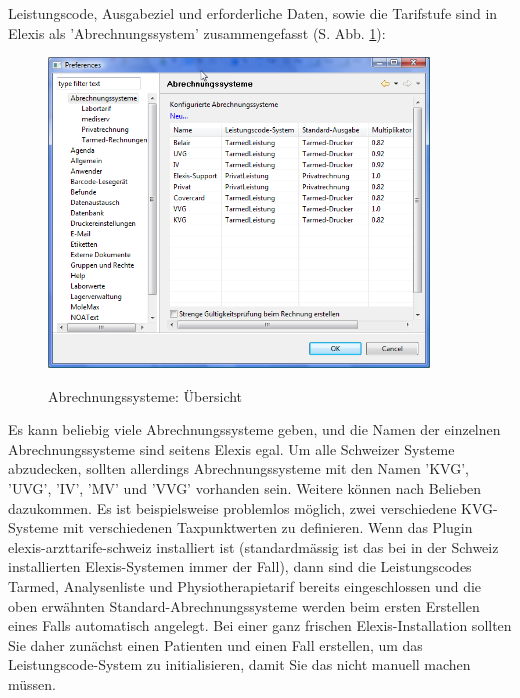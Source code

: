 \documentclass[a4paper]{scrartcl}
\begin{document}
Leistungscode, Ausgabeziel und erforderliche Daten, sowie die Tarifstufe sind in Elexis als 'Abrechnungssystem' zusammengefasst (S. Abb. \ref{fig:abr1}):
\begin{figure}
  \includegraphics[width=0.9\textwidth]{abr1}\\
  \caption{Abrechnungssysteme: Übersicht}\label{fig:abr1}
\end{figure}
Es kann beliebig viele Abrechnungssysteme geben, und die Namen der einzelnen Abrechnungssysteme sind seitens Elexis egal. Um alle Schweizer Systeme abzudecken, sollten allerdings Abrechnungssysteme mit den Namen 'KVG', 'UVG', 'IV', 'MV' und 'VVG' vorhanden sein. Weitere können nach Belieben dazukommen. Es ist beispielsweise problemlos möglich, zwei verschiedene KVG-Systeme mit verschiedenen Taxpunktwerten zu definieren. Wenn das Plugin elexis-arzttarife-schweiz installiert ist (standardmässig ist das bei in der Schweiz installierten Elexis-Systemen immer der Fall), dann sind die Leistungscodes Tarmed, Analysenliste und Physiotherapietarif bereits eingeschlossen und die oben erwähnten Standard-Abrechnungssysteme werden beim ersten Erstellen eines Falls automatisch angelegt. Bei einer ganz frischen Elexis-Installation sollten Sie daher zunächst einen Patienten und einen Fall erstellen, um das Leistungscode-System zu initialisieren, damit Sie das nicht manuell machen müssen.

\medskip
\end{document}
